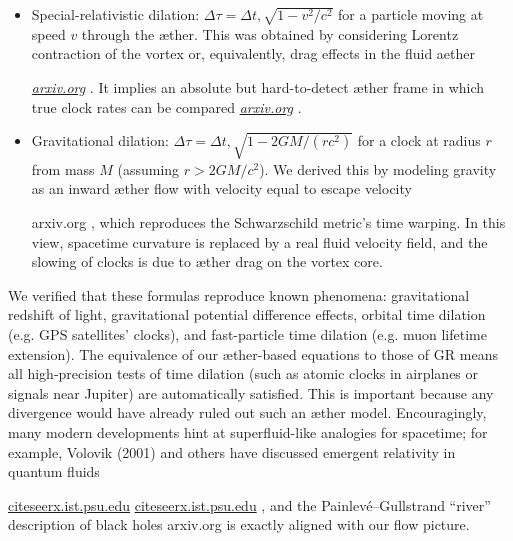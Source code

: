 \documentclass[aps,preprint,superscriptaddress]{revtex4}
\begin{document}
\begin{itemize}

\item
Special-relativistic dilation: $\displaystyle \Delta \tau = \Delta t,\sqrt{1-v^2/c^2}$ for a particle moving at speed $v$ through the æther. This was obtained by considering Lorentz contraction of the vortex or, equivalently, drag effects in the fluid aether

\href{https://arxiv.org/pdf/2012.07395#:~:text=which%20contains%20the%20familiar%20Lorentz,the%20Lorentz%20factor}{\textit{arxiv.org}}
. It implies an absolute but hard-to-detect æther frame in which true clock rates can be compared
\href{https://arxiv.org/pdf/physics/0611077#:~:text=We%20should%20note%20that%2C%20when,a%20state%20of%20absolute%20rest}{\textit{arxiv.org}}
.




\item
Gravitational dilation: $\displaystyle \Delta \tau = \Delta t,\sqrt{1-2GM/(r c^2)}$ for a clock at radius $r$ from mass $M$ (assuming $r>2GM/c^2$). We derived this by modeling gravity as an inward æther flow with velocity equal to escape velocity

arxiv.org
, which reproduces the Schwarzschild metric’s time warping. In this view, spacetime curvature is replaced by a real fluid velocity field, and the slowing of clocks is due to æther drag on the vortex core.




\end{itemize}

We verified that these formulas reproduce known phenomena: gravitational redshift of light, gravitational potential difference effects, orbital time dilation (e.g. GPS satellites’ clocks), and fast-particle time dilation (e.g. muon lifetime extension). The equivalence of our æther-based equations to those of GR means all high-precision tests of time dilation (such as atomic clocks in airplanes or signals near Jupiter) are automatically satisfied. This is important because any divergence would have already ruled out such an æther model. Encouragingly, many modern developments hint at superfluid-like analogies for spacetime; for example, Volovik (2001) and others have discussed emergent relativity in quantum fluids

\href{https://citeseerx.ist.psu.edu/document?repid=rep1&type=pdf&doi=25483f1ebc9dc442a9f1505a49d96eb35e92e3f4#:~:text=al,related%20to%20this%20hypothesis%2C%20including}{citeseerx.ist.psu.edu}
 \href{https://citeseerx.ist.psu.edu/document?repid=rep1&type=pdf&doi=25483f1ebc9dc442a9f1505a49d96eb35e92e3f4#:~:text=45,on%20General%20Relativity%20and%20Relativistic}{citeseerx.ist.psu.edu}
, and the Painlevé–Gullstrand “river” description of black holes arxiv.org
 is exactly aligned with our flow picture.
\end{document}
